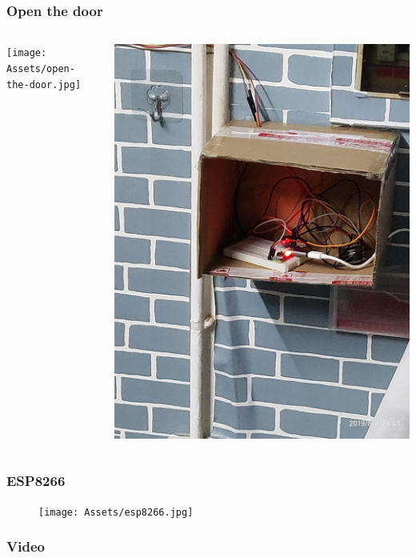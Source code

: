 \begin{frame}
    \frametitle{Open the door}
    \begin{columns}
        \texttt{[image: Assets/open-the-door.jpg]}

        \includegraphics[width=\linewidth]{Assets/control.jpg}

    \end{columns}
\end{frame}
\begin{frame}
    \frametitle{ESP8266}
    \begin{figure}
        \texttt{[image: Assets/esp8266.jpg]}
    \end{figure}
\end{frame}
\begin{frame}
    \frametitle{Video}



\end{frame}
